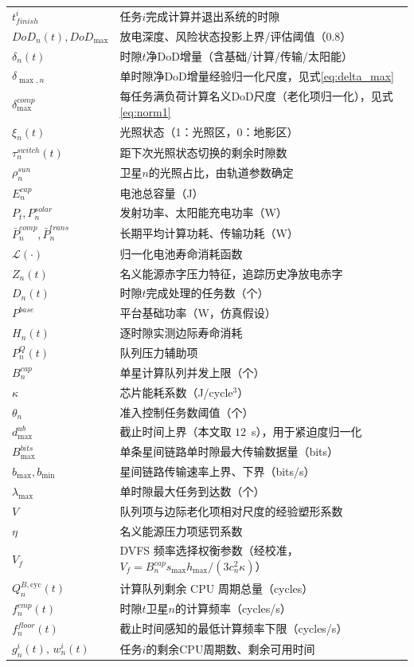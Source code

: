 \documentclass[a4paper,11pt]{article}
\begin{document}
\begin{table}[t]
\begin{tabular}{ll}
$t^i_{finish}$ & 任务$i$完成计算并退出系统的时隙 \\
$DoD_n(t), DoD_{\max}$ & 放电深度、风险状态投影上界/评估阈值（0.8） \\
$\delta_n(t)$ & 时隙$t$净DoD增量（含基础/计算/传输/太阳能） \\
$\delta_{\max,n}$ & 单时隙净DoD增量经验归一化尺度，见式\eqref{eq:delta_max} \\
$\delta^{comp}_{\max}$ & 每任务满负荷计算名义DoD尺度（老化项归一化），见式\eqref{eq:norm1} \\
$\xi_n(t)$ & 光照状态（1：光照区，0：地影区） \\
$\tau^{switch}_n(t)$ & 距下次光照状态切换的剩余时隙数 \\
$\rho^{sun}_n$ & 卫星$n$的光照占比，由轨道参数确定 \\
$E^{cap}_n$ & 电池总容量（J） \\
$P_t, P^{solar}_n$ & 发射功率、太阳能充电功率（W） \\
$\bar{P}^{comp}_n, \bar{P}^{trans}_n$ & 长期平均计算功耗、传输功耗（W） \\
$\mathcal{L}(\cdot)$ & 归一化电池寿命消耗函数 \\
$Z_n(t)$ & 名义能源赤字压力特征，追踪历史净放电赤字 \\
$D_n(t)$ & 时隙$t$完成处理的任务数（个） \\
$P^{base}$ & 平台基础功率（W，仿真假设） \\
$H_n(t)$ & 逐时隙实测边际寿命消耗 \\
$P^Q_n(t)$ & 队列压力辅助项 \\
$B^{cap}_n$ & 单星计算队列并发上限（个） \\
$\kappa$ & 芯片能耗系数（J/cycle$^3$） \\
$\theta_n$ & 准入控制任务数阈值（个） \\
$d^{ub}_{\max}$ & 截止时间上界（本文取 $12$~s），用于紧迫度归一化 \\
$B^{bits}_{\max}$ & 单条星间链路单时隙最大传输数据量（bits） \\
$b_{\max}, b_{\min}$ & 星间链路传输速率上界、下界（bits/s） \\
$\lambda_{\max}$ & 单时隙最大任务到达数（个） \\
$V$ & 队列项与边际老化项相对尺度的经验塑形系数 \\
$\eta$ & 名义能源压力项惩罚系数 \\
$V_f$ & DVFS 频率选择权衡参数（经校准，$V_f=B^{cap}_n s_{\max} h_{\max}/(3c_n^2\kappa)$） \\
$Q^{B,\mathrm{cyc}}_n(t)$ & 计算队列剩余 CPU 周期总量（cycles） \\
$f^{cmp}_n(t)$ & 时隙$t$卫星$n$的计算频率（cycles/s） \\
$f^{floor}_n(t)$ & 截止时间感知的最低计算频率下限（cycles/s） \\
$g^i_n(t),\,w^i_n(t)$ & 任务$i$的剩余CPU周期数、剩余可用时间 \\
\bottomrule
\end{tabular}
\end{table}
\end{document}
